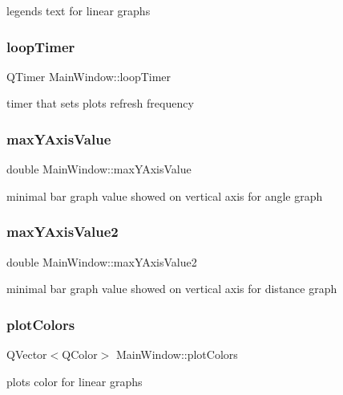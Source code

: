 legend\textquotesingle{}s text for linear graphs \mbox{\label{class_main_window_a623ca812f462c5bc27daf8a94cff59d1}} 
\subsubsection{loop\+Timer}
{\footnotesize\ttfamily Q\+Timer Main\+Window\+::loop\+Timer\hspace{0.3cm}{\ttfamily [private]}}

timer that sets plots refresh frequency \mbox{\label{class_main_window_a79199e3cec2bb50434f184cc762bce2e}} 
\subsubsection{max\+Y\+Axis\+Value}
{\footnotesize\ttfamily double Main\+Window\+::max\+Y\+Axis\+Value\hspace{0.3cm}{\ttfamily [private]}}

minimal bar graph value showed on vertical axis for angle graph \mbox{\label{class_main_window_a5cbbcacb99514a12d6743ebb45836f12}} 
\subsubsection{max\+Y\+Axis\+Value2}
{\footnotesize\ttfamily double Main\+Window\+::max\+Y\+Axis\+Value2\hspace{0.3cm}{\ttfamily [private]}}

minimal bar graph value showed on vertical axis for distance graph \mbox{\label{class_main_window_af05a0194c683ce9a5abb789e636494da}} 
\subsubsection{plot\+Colors}
{\footnotesize\ttfamily Q\+Vector$<$Q\+Color$>$ Main\+Window\+::plot\+Colors\hspace{0.3cm}{\ttfamily [private]}}

plot\textquotesingle{}s color for linear graphs \mbox{\label{class_main_window_a390ce6d302bff7952eee7d92a6cf3da3}} 
